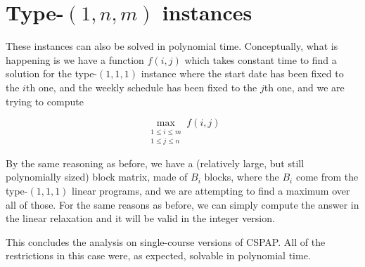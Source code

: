 \section{Type-$(1, n, m)$ instances}

These instances can also be solved in polynomial time. Conceptually, what is happening is we have a function $f(i, j)$ which takes constant time to find a solution for the type-$(1, 1, 1)$ instance where the start date has been fixed to the $i$th one, and the weekly schedule has been fixed to the $j$th one, and we are trying to compute

$$
\max_{\substack{1 \le i \le m\\1 \le j \le n}} f(i, j)
$$

By the same reasoning as before, we have a (relatively large, but still polynomially sized) block matrix, made of $B_i$ blocks, where the $B_i$ come from the type-$(1, 1, 1)$ linear programs, and we are attempting to find a maximum over all of those. For the same reasons as before, we can simply compute the answer in the linear relaxation and it will be valid in the integer version.

This concludes the analysis on single-course versions of CSPAP. All of the restrictions in this case were, as expected, solvable in polynomial time.
